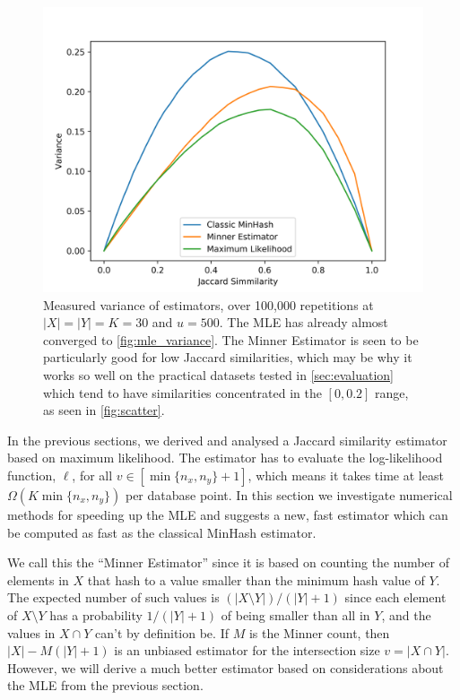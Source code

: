 \begin{figure}
   \includegraphics[trim=10 0 45 40,clip,width=\linewidth]{figures/synvar_100000.png}
   \caption{Measured variance of estimators, over 100,000 repetitions at $|X|=|Y|=K=30$ and $u=500$.
      The MLE has already almost converged to \cref{fig:mle_variance}.
      The Minner Estimator is seen to be particularly good for low Jaccard similarities, which may be why it works so well on the practical datasets tested in \cref{sec:evaluation} which tend to have similarities concentrated in the $[0,0.2]$ range, as seen in \cref{fig:scatter}.}
   \label{fig:exp_variance}
\end{figure}

In the previous sections, we derived and analysed a Jaccard similarity estimator based on maximum likelihood.
The estimator has to evaluate the log-likelihood function, $\ell$, for all $v\in[\min\{n_x,n_y\}+1]$, which means it takes time at least $\Omega(K\min\{n_x,n_y\})$ per database point.
In this section we investigate numerical methods for speeding up the MLE and suggests a new, fast estimator which can be computed as fast as the classical MinHash estimator.

We call this the ``Minner Estimator'' since it is based on counting the number of elements in $X$ that hash to a value smaller than the minimum hash value of $Y$.
The expected number of such values is $(|X\setminus Y|)/(|Y|+1)$ since each element of $X\setminus Y$ has a probability $1/(|Y|+1)$ of being smaller than all in $Y$, and the values in $X\cap Y$ can't by definition be.
If $M$ is the Minner count, then $|X| - M(|Y|+1)$ is an unbiased estimator for the intersection size $v=|X\cap Y|$.
However, we will derive a much better estimator based on considerations about the MLE from the previous section.

